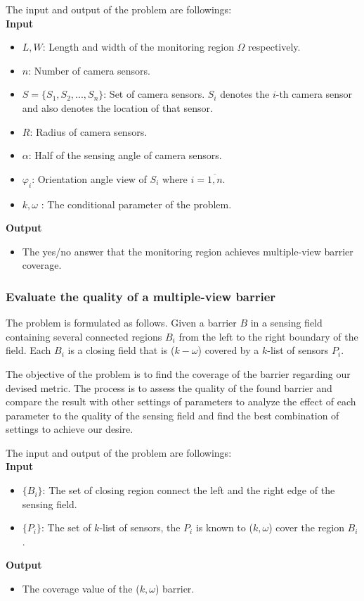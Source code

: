 \noindent The input and output of the problem are followings:\\[7pt]
{\bfseries Input}
\begin{itemize}
	\item $L, W$: Length and width of the monitoring region $\Omega$ respectively.
	\item $n$: Number of camera sensors.
	\item $S = \{S_1,S_2,...,S_n\}$: Set of camera sensors. $S_i$ denotes the $i$-th camera sensor and also denotes the location of that sensor.
	\item $R$: Radius of camera sensors.
	\item $\alpha$: Half of the sensing angle of camera sensors.
	\item $\varphi_i$: Orientation angle view of $S_i$ where $i=\overline{1,n}$.
	\item $k, \omega$ : The conditional parameter of the problem.
\end{itemize}
{\bfseries Output}
\begin{itemize}
	\item The yes/no answer that the monitoring region achieves multiple-view barrier coverage. 
\end{itemize}

\subsubsection{Evaluate the quality of a multiple-view barrier}
The problem is formulated as follows. Given a barrier $B$ in a sensing field containing several connected regions $B_i$ from the left to the right boundary of the field. Each $B_i$ is a closing field that is ($k-\omega$) covered by a $k$-list of sensors $P_i$.

The objective of the problem is to find the coverage of the barrier regarding our devised metric. The process is to assess the quality of the found barrier and compare the result with other settings of parameters to analyze the effect of each parameter to the quality of the sensing field and find the best combination of settings to achieve our desire.

\noindent The input and output of the problem are followings:\\[7pt]
{\bfseries Input}
\begin{itemize}
	\item $\{B_i\}$: The set of closing region connect the left and the right edge of the sensing field.
	\item $\{P_i\}$: The set of $k$-list of sensors, the $P_i$ is known to ($k,\omega$) cover the region $B_i$.
\end{itemize}
{\bfseries Output}
\begin{itemize}
	\item The coverage value of the ($k,\omega$) barrier.
\end{itemize}